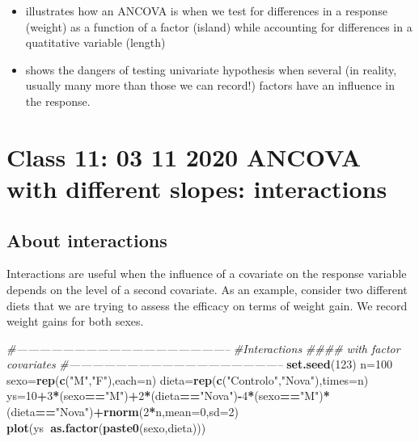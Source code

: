 \documentclass[
]{book}
\newenvironment{Shaded}{\begin{snugshade}}{\end{snugshade}}
\newcommand{\CommentTok}[1]{\textcolor[rgb]{0.56,0.35,0.01}{\textit{#1}}}
\newcommand{\DataTypeTok}[1]{\textcolor[rgb]{0.13,0.29,0.53}{#1}}
\newcommand{\DecValTok}[1]{\textcolor[rgb]{0.00,0.00,0.81}{#1}}
\newcommand{\KeywordTok}[1]{\textcolor[rgb]{0.13,0.29,0.53}{\textbf{#1}}}
\newcommand{\NormalTok}[1]{#1}
\newcommand{\OperatorTok}[1]{\textcolor[rgb]{0.81,0.36,0.00}{\textbf{#1}}}
\newcommand{\StringTok}[1]{\textcolor[rgb]{0.31,0.60,0.02}{#1}}
\providecommand{\tightlist}{%
  \setlength{\itemsep}{0pt}\setlength{\parskip}{0pt}}
\begin{document}
\begin{itemize}
\tightlist
\item
  illustrates how an ANCOVA is when we test for differences in a response (weight) as a function of a factor (island) while accounting for differences in a quatitative variable (length)
\item
  shows the dangers of testing univariate hypothesis when several (in reality, usually many more than those we can record!) factors have an influence in the response.
\end{itemize}

\hypertarget{aula11}{%
\chapter{Class 11: 03 11 2020 ANCOVA with different slopes: interactions}\label{aula11}}

\hypertarget{about-interactions}{%
\section{About interactions}\label{about-interactions}}

Interactions are useful when the influence of a covariate on the response variable depends on the level of a second covariate. As an example, consider two different diets that we are trying to assess the efficacy on terms of weight gain. We record weight gains for both sexes.

\begin{Shaded}
\begin{Highlighting}[]
\CommentTok{#--------------------------------------------------------}
\CommentTok{#Interactions}
\CommentTok{#### with factor covariates}
\CommentTok{#--------------------------------------------------------}
\KeywordTok{set.seed}\NormalTok{(}\DecValTok{123}\NormalTok{)}
\NormalTok{n=}\DecValTok{100}
\NormalTok{sexo=}\KeywordTok{rep}\NormalTok{(}\KeywordTok{c}\NormalTok{(}\StringTok{"M"}\NormalTok{,}\StringTok{"F"}\NormalTok{),}\DataTypeTok{each=}\NormalTok{n)}
\NormalTok{dieta=}\KeywordTok{rep}\NormalTok{(}\KeywordTok{c}\NormalTok{(}\StringTok{"Controlo"}\NormalTok{,}\StringTok{"Nova"}\NormalTok{),}\DataTypeTok{times=}\NormalTok{n)}
\NormalTok{ys=}\DecValTok{10}\OperatorTok{+}\DecValTok{3}\OperatorTok{*}\NormalTok{(sexo}\OperatorTok{==}\StringTok{"M"}\NormalTok{)}\OperatorTok{+}\DecValTok{2}\OperatorTok{*}\NormalTok{(dieta}\OperatorTok{==}\StringTok{"Nova"}\NormalTok{)}\OperatorTok{-}\DecValTok{4}\OperatorTok{*}\NormalTok{(sexo}\OperatorTok{==}\StringTok{"M"}\NormalTok{)}\OperatorTok{*}\NormalTok{(dieta}\OperatorTok{==}\StringTok{"Nova"}\NormalTok{)}\OperatorTok{+}\KeywordTok{rnorm}\NormalTok{(}\DecValTok{2}\OperatorTok{*}\NormalTok{n,}\DataTypeTok{mean=}\DecValTok{0}\NormalTok{,}\DataTypeTok{sd=}\DecValTok{2}\NormalTok{)}
\KeywordTok{plot}\NormalTok{(ys}\OperatorTok{~}\KeywordTok{as.factor}\NormalTok{(}\KeywordTok{paste0}\NormalTok{(sexo,dieta)))}
\end{Highlighting}
\end{Shaded}
\end{document}
